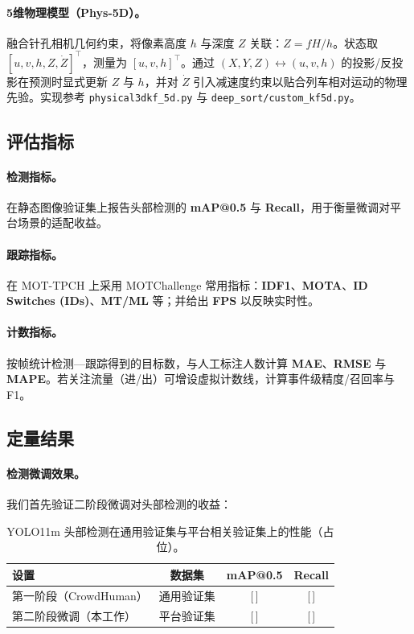 \paragraph{5维物理模型（Phys-5D）。} 融合针孔相机几何约束，将像素高度 \(h\) 与深度 \(Z\) 关联：\(Z = fH/h\)。状态取 \([u, v, h, Z, \dot Z]^\top\)，测量为 \([u, v, h]^\top\)。通过 \((X,Y,Z) \leftrightarrow (u,v,h)\) 的投影/反投影在预测时显式更新 \(Z\) 与 \(h\)，并对 \(\dot Z\) 引入减速度约束以贴合列车相对运动的物理先验。实现参考 \texttt{physical3dkf\_5d.py} 与 \texttt{deep\_sort/custom\_kf5d.py}。

\subsection{评估指标}
\paragraph{检测指标。} 在静态图像验证集上报告头部检测的 \textbf{mAP@0.5} 与 \textbf{Recall}，用于衡量微调对平台场景的适配收益。

\paragraph{跟踪指标。} 在 MOT-TPCH 上采用 MOTChallenge 常用指标：\textbf{IDF1}、\textbf{MOTA}、\textbf{ID Switches (IDs)}、\textbf{MT/ML} 等；并给出 \textbf{FPS} 以反映实时性。

\paragraph{计数指标。} 按帧统计检测—跟踪得到的目标数，与人工标注人数计算 \textbf{MAE}、\textbf{RMSE} 与 \textbf{MAPE}。若关注流量（进/出）可增设虚拟计数线，计算事件级精度/召回率与 F1。



\subsection{定量结果}
\paragraph{检测微调效果。} 我们首先验证二阶段微调对头部检测的收益：
\begin{table}[H]
    \centering
    \caption{YOLO11m 头部检测在通用验证集与平台相关验证集上的性能（占位）。}
    \label{tab:detector}
    \begin{tabular}{lccc}
        \toprule
        设置 & 数据集 & mAP@0.5 & Recall \\
        \midrule
        第一阶段（CrowdHuman） & 通用验证集 & [\,] & [\,] \\
        第二阶段微调（本工作） & 平台验证集 & [\,] & [\,] \\
        \bottomrule
    \end{tabular}
\end{table}

